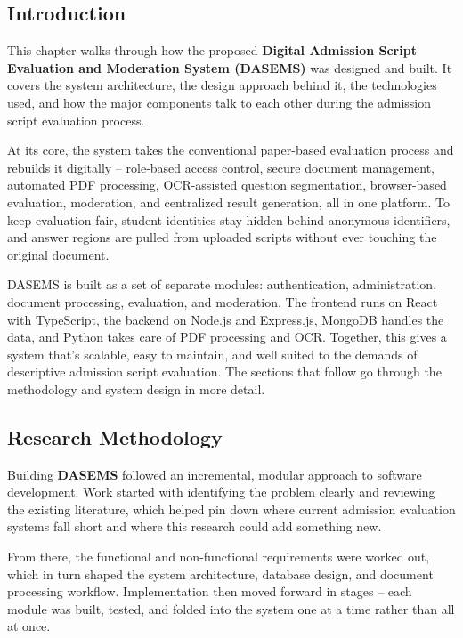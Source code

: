 \vspace{0.5cm}

\subsection{Introduction}

This chapter walks through how the proposed \textbf{Digital Admission Script Evaluation and Moderation System (DASEMS)} was designed and built. It covers the system architecture, the design approach behind it, the technologies used, and how the major components talk to each other during the admission script evaluation process.

At its core, the system takes the conventional paper-based evaluation process and rebuilds it digitally -- role-based access control, secure document management, automated PDF processing, OCR-assisted question segmentation, browser-based evaluation, moderation, and centralized result generation, all in one platform. To keep evaluation fair, student identities stay hidden behind anonymous identifiers, and answer regions are pulled from uploaded scripts without ever touching the original document.

DASEMS is built as a set of separate modules: authentication, administration, document processing, evaluation, and moderation. The frontend runs on React with TypeScript, the backend on Node.js and Express.js, MongoDB handles the data, and Python takes care of PDF processing and OCR. Together, this gives a system that's scalable, easy to maintain, and well suited to the demands of descriptive admission script evaluation. The sections that follow go through the methodology and system design in more detail.

\subsection{Research Methodology}

Building \textbf{DASEMS} followed an incremental, modular approach to software development. Work started with identifying the problem clearly and reviewing the existing literature, which helped pin down where current admission evaluation systems fall short and where this research could add something new.

From there, the functional and non-functional requirements were worked out, which in turn shaped the system architecture, database design, and document processing workflow. Implementation then moved forward in stages -- each module was built, tested, and folded into the system one at a time rather than all at once.


